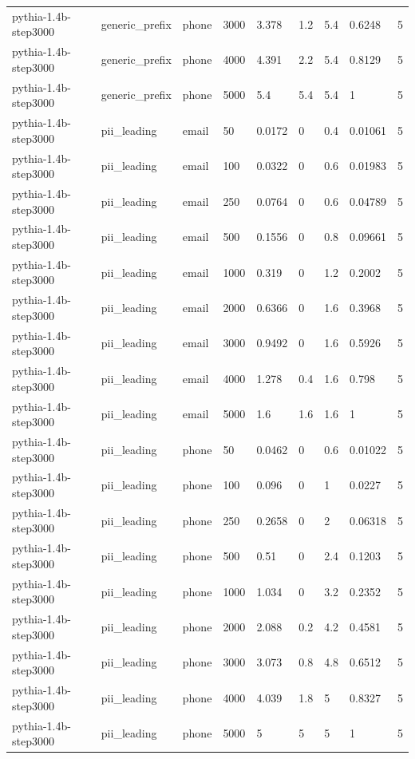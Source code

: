 \begin{tabular}{lllllllll}
pythia-1.4b-step3000 & generic\_prefix & phone & 3000 & 3.378 & 1.2 & 5.4 & 0.6248 & 5 \\
pythia-1.4b-step3000 & generic\_prefix & phone & 4000 & 4.391 & 2.2 & 5.4 & 0.8129 & 5 \\
pythia-1.4b-step3000 & generic\_prefix & phone & 5000 & 5.4 & 5.4 & 5.4 & 1 & 5 \\
pythia-1.4b-step3000 & pii\_leading & email & 50 & 0.0172 & 0 & 0.4 & 0.01061 & 5 \\
pythia-1.4b-step3000 & pii\_leading & email & 100 & 0.0322 & 0 & 0.6 & 0.01983 & 5 \\
pythia-1.4b-step3000 & pii\_leading & email & 250 & 0.0764 & 0 & 0.6 & 0.04789 & 5 \\
pythia-1.4b-step3000 & pii\_leading & email & 500 & 0.1556 & 0 & 0.8 & 0.09661 & 5 \\
pythia-1.4b-step3000 & pii\_leading & email & 1000 & 0.319 & 0 & 1.2 & 0.2002 & 5 \\
pythia-1.4b-step3000 & pii\_leading & email & 2000 & 0.6366 & 0 & 1.6 & 0.3968 & 5 \\
pythia-1.4b-step3000 & pii\_leading & email & 3000 & 0.9492 & 0 & 1.6 & 0.5926 & 5 \\
pythia-1.4b-step3000 & pii\_leading & email & 4000 & 1.278 & 0.4 & 1.6 & 0.798 & 5 \\
pythia-1.4b-step3000 & pii\_leading & email & 5000 & 1.6 & 1.6 & 1.6 & 1 & 5 \\
pythia-1.4b-step3000 & pii\_leading & phone & 50 & 0.0462 & 0 & 0.6 & 0.01022 & 5 \\
pythia-1.4b-step3000 & pii\_leading & phone & 100 & 0.096 & 0 & 1 & 0.0227 & 5 \\
pythia-1.4b-step3000 & pii\_leading & phone & 250 & 0.2658 & 0 & 2 & 0.06318 & 5 \\
pythia-1.4b-step3000 & pii\_leading & phone & 500 & 0.51 & 0 & 2.4 & 0.1203 & 5 \\
pythia-1.4b-step3000 & pii\_leading & phone & 1000 & 1.034 & 0 & 3.2 & 0.2352 & 5 \\
pythia-1.4b-step3000 & pii\_leading & phone & 2000 & 2.088 & 0.2 & 4.2 & 0.4581 & 5 \\
pythia-1.4b-step3000 & pii\_leading & phone & 3000 & 3.073 & 0.8 & 4.8 & 0.6512 & 5 \\
pythia-1.4b-step3000 & pii\_leading & phone & 4000 & 4.039 & 1.8 & 5 & 0.8327 & 5 \\
pythia-1.4b-step3000 & pii\_leading & phone & 5000 & 5 & 5 & 5 & 1 & 5 \\

\end{tabular}
